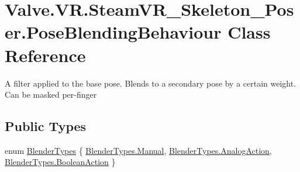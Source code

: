 \hypertarget{class_valve_1_1_v_r_1_1_steam_v_r___skeleton___poser_1_1_pose_blending_behaviour}{}\section{Valve.\+V\+R.\+Steam\+V\+R\+\_\+\+Skeleton\+\_\+\+Poser.\+Pose\+Blending\+Behaviour Class Reference}
\label{class_valve_1_1_v_r_1_1_steam_v_r___skeleton___poser_1_1_pose_blending_behaviour}


A filter applied to the base pose. Blends to a secondary pose by a certain weight. Can be masked per-\/finger  


\subsection*{Public Types}
\begin{DoxyCompactItemize}
\item 
enum \mbox{\hyperlink{class_valve_1_1_v_r_1_1_steam_v_r___skeleton___poser_1_1_pose_blending_behaviour_a21b1f78c5e6dbf96a079d555954a6ae6}{Blender\+Types}} \{ \mbox{\hyperlink{class_valve_1_1_v_r_1_1_steam_v_r___skeleton___poser_1_1_pose_blending_behaviour_a21b1f78c5e6dbf96a079d555954a6ae6ae1ba155a9f2e8c3be94020eef32a0301}{Blender\+Types.\+Manual}}, 
\mbox{\hyperlink{class_valve_1_1_v_r_1_1_steam_v_r___skeleton___poser_1_1_pose_blending_behaviour_a21b1f78c5e6dbf96a079d555954a6ae6a6c39fff90b8c7eed8fbf4df285069f79}{Blender\+Types.\+Analog\+Action}}, 
\mbox{\hyperlink{class_valve_1_1_v_r_1_1_steam_v_r___skeleton___poser_1_1_pose_blending_behaviour_a21b1f78c5e6dbf96a079d555954a6ae6a3079a72b41f4fbada367985b120f93cf}{Blender\+Types.\+Boolean\+Action}}
 \}
\end{DoxyCompactItemize}
